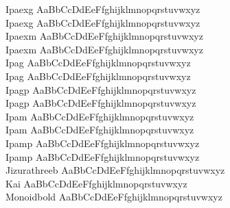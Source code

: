 \begin{tabbing}
Ipaexg \> { AaBbCcDdEeFfghijklmnopqrstuvwxyz} \\
Ipaexg \> { AaBbCcDdEeFfghijklmnopqrstuvwxyz} \\
Ipaexm \> { AaBbCcDdEeFfghijklmnopqrstuvwxyz} \\
Ipaexm \> { AaBbCcDdEeFfghijklmnopqrstuvwxyz} \\
Ipag \> { AaBbCcDdEeFfghijklmnopqrstuvwxyz} \\
Ipag \> { AaBbCcDdEeFfghijklmnopqrstuvwxyz} \\
Ipagp \> { AaBbCcDdEeFfghijklmnopqrstuvwxyz} \\
Ipagp \> { AaBbCcDdEeFfghijklmnopqrstuvwxyz} \\
Ipam \> { AaBbCcDdEeFfghijklmnopqrstuvwxyz} \\
Ipam \> { AaBbCcDdEeFfghijklmnopqrstuvwxyz} \\
Ipamp \> { AaBbCcDdEeFfghijklmnopqrstuvwxyz} \\
Ipamp \> { AaBbCcDdEeFfghijklmnopqrstuvwxyz} \\
Jizurathreeb \> { AaBbCcDdEeFfghijklmnopqrstuvwxyz} \\
Kai \> { AaBbCcDdEeFfghijklmnopqrstuvwxyz} \\
Monoidbold \> { AaBbCcDdEeFfghijklmnopqrstuvwxyz} \\

\end{tabbing}
